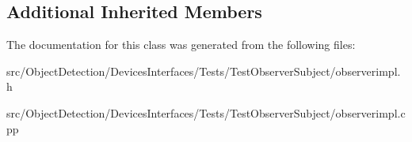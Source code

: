 \subsection*{Additional Inherited Members}


The documentation for this class was generated from the following files\+:\begin{DoxyCompactItemize}
\item 
src/\+Object\+Detection/\+Devices\+Interfaces/\+Tests/\+Test\+Observer\+Subject/observerimpl.\+h\item 
src/\+Object\+Detection/\+Devices\+Interfaces/\+Tests/\+Test\+Observer\+Subject/observerimpl.\+cpp\end{DoxyCompactItemize}
